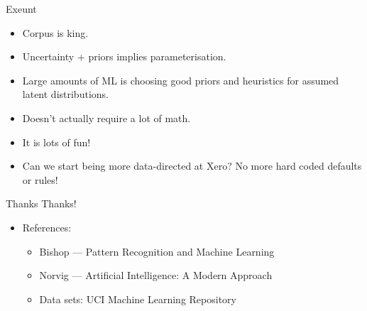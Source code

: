 \documentclass{beamer}
\begin{document}
\begin{frame}{Exeunt}
  \begin{itemize}
    \item Corpus is king.
    \item Uncertainty + priors implies parameterisation.
    \item Large amounts of ML is choosing good priors and heuristics
      for assumed latent distributions.
    \item Doesn't actually require a lot of math.
    \item It is lots of fun!
    \item Can we start being more data-directed at Xero? No more hard
      coded defaults or rules!
  \end{itemize}
\end{frame}

\begin{frame}{Thanks}
  Thanks!

  \begin{itemize}
    \item References:
    \begin{itemize}
      \item Bishop --- Pattern Recognition and Machine Learning
      \item Norvig --- Artificial Intelligence: A Modern Approach
      \item Data sets: UCI Machine Learning Repository
    \end{itemize}
  \end{itemize}
\end{frame}
\end{document}
